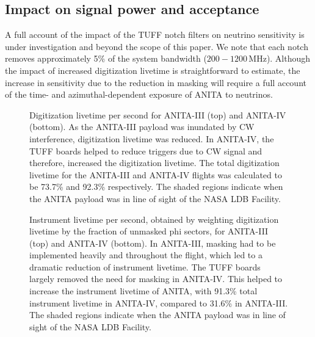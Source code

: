 \documentclass[preprint,12pt]{elsarticle}
\begin{document}
\subsection{Impact on signal power and acceptance}

A full account of the impact of the TUFF notch filters on neutrino sensitivity is under investigation
 and beyond the scope of this paper.  We note that each notch removes approximately 5\% 
 of the system bandwidth ($200 - 1200\,\mbox{MHz}$).  Although the impact of increased digitization 
 livetime is straightforward to estimate, the increase in sensitivity
 due to the reduction in masking will require a full account of the time- and azimuthal-dependent exposure of ANITA to neutrinos.

\begin{figure}[H]
\centering
{}
\caption[]{Digitization livetime per second for ANITA-III (top) and ANITA-IV (bottom).
As the ANITA-III payload was inundated by CW interference, digitization livetime was reduced. In ANITA-IV, the TUFF boards helped 
to reduce triggers due to CW signal and therefore, increased the digitization livetime. 
The total digitization livetime for the ANITA-III and ANITA-IV flights 
was calculated to be 73.7\% and 92.3\% respectively.
The shaded regions indicate when the 
ANITA payload was in line of sight of the NASA LDB Facility. 
}
\label{dig_livetime}
\end{figure}

\begin{figure}[H]
\centering
{}
\caption[]{Instrument livetime per second, obtained by weighting digitization livetime by the fraction of
unmasked phi sectors, for ANITA-III (top) and ANITA-IV (bottom). 
In ANITA-III, masking had to be implemented heavily and throughout the flight, which led to a dramatic reduction of
instrument livetime. The TUFF boards largely removed the need for masking in ANITA-IV. 
This helped to increase the 
instrument livetime of ANITA, with 91.3\% total instrument livetime in ANITA-IV,  compared to 31.6\% in ANITA-III.
The shaded regions indicate when the 
ANITA payload was in line of sight of the NASA LDB Facility. 
}
\label{livetime}
\end{figure}
\end{document}
